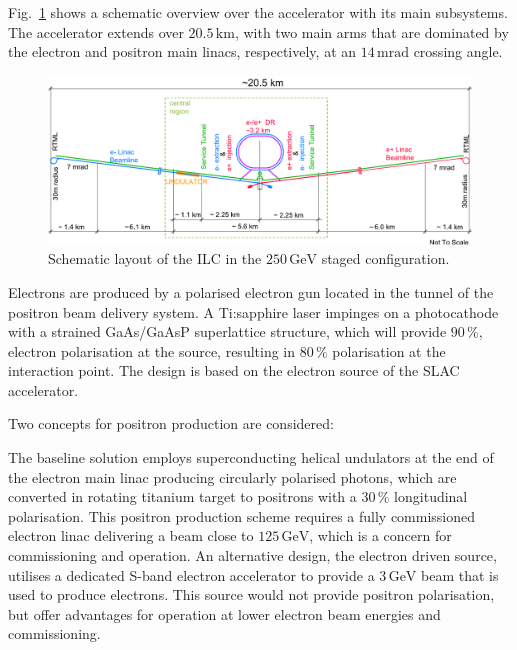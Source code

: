 \documentclass[%
 reprint,
 amsmath,amssymb,
 aps,
]{revtex4-1}
\begin{document}
Fig.~\ref{fig_ilc-schematic} shows a schematic overview over the accelerator with its main subsystems.
The accelerator extends over $20.5\,{\mathrm{km}}$, with two main arms that are dominated by the electron and positron main linacs, respectively, at an $14\,{\mathrm{mrad}}$ crossing angle.

 \begin{figure}[tb]
 \begin{center}
 \includegraphics[width=\hsize]{figures/TDR-machine-layout-cartoon-staged.pdf}
\caption{Schematic layout of the ILC in the $250\,{\mathrm{GeV}}$ staged configuration.
\label{fig_ilc-schematic}}
 \end{center}
 \end{figure}

Electrons are produced by a polarised electron gun located in the tunnel of the positron beam delivery system. A Ti:sapphire laser impinges on a photocathode with a strained GaAs/GaAsP superlattice structure, which will provide  $90\,\%$, electron polarisation at the source, resulting in $80\,\%$ polarisation at the interaction point. The design is based on the electron source of the SLAC accelerator. 

Two concepts for positron production are considered:

The baseline solution employs superconducting helical undulators at the end of the electron main linac producing circularly polarised photons, which are converted in rotating titanium target to  positrons with a $30\,\%$ longitudinal polarisation.
This positron production scheme requires a fully commissioned electron linac delivering a beam close to $125\,{\mathrm{GeV}}$, which is a concern for commissioning and operation. 
An alternative design, the electron driven source, utilises a dedicated S-band electron accelerator to provide a $3\,{\mathrm{GeV}}$ beam that is used to produce electrons.
This source would not provide positron polarisation,
but offer advantages for operation at lower electron beam energies and commissioning.
\end{document}
